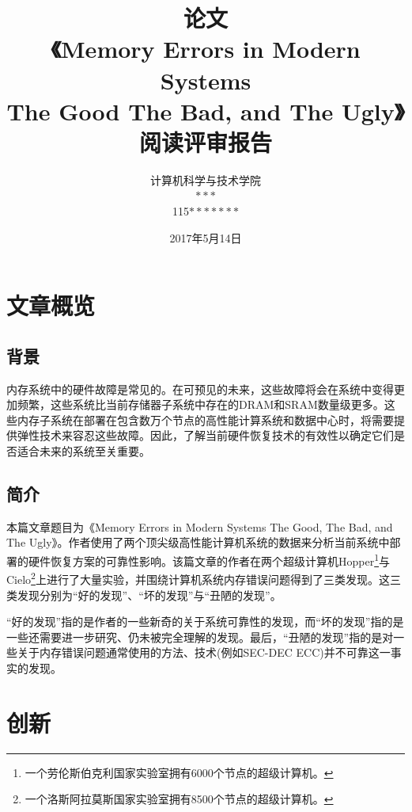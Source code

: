 \documentclass[11pt, a4paper]{article}
\begin{document}
\title{\bf 论文\\《Memory Errors in Modern Systems\\ The Good The Bad, and The Ugly》\\阅读评审报告}
\author{计算机科学与技术学院\\$\ast\ast\ast$\\115$\ast\ast\ast\ast\ast\ast\ast$}
\date{2017年5月14日}
\maketitle
\tableofcontents

\section{文章概览}

\subsection{背景}

内存系统中的硬件故障是常见的。在可预见的未来，这些故障将会在系统中变得更加频繁，这些系统比当前存储器子系统中存在的DRAM和SRAM数量级更多。这些内存子系统在部署在包含数万个节点的高性能计算系统和数据中心时，将需要提供弹性技术来容忍这些故障。因此，了解当前硬件恢复技术的有效性以确定它们是否适合未来的系统至关重要。

\subsection{简介}

本篇文章题目为《Memory Errors in Modern Systems The Good, The Bad, and The Ugly》。作者使用了两个顶尖级高性能计算机系统的数据来分析当前系统中部署的硬件恢复方案的可靠性影响。该篇文章的作者在两个超级计算机Hopper\footnote{一个劳伦斯伯克利国家实验室拥有6000个节点的超级计算机。}与Cielo\footnote{一个洛斯阿拉莫斯国家实验室拥有8500个节点的超级计算机。}上进行了大量实验，并围绕计算机系统内存错误问题得到了三类发现。这三类发现分别为“好的发现”、“坏的发现”与“丑陋的发现”。

“好的发现”指的是作者的一些新奇的关于系统可靠性的发现，而“坏的发现”指的是一些还需要进一步研究、仍未被完全理解的发现。最后，“丑陋的发现”指的是对一些关于内存错误问题通常使用的方法、技术(例如SEC-DEC ECC)并不可靠这一事实的发现。

\section{创新}
\end{document}
